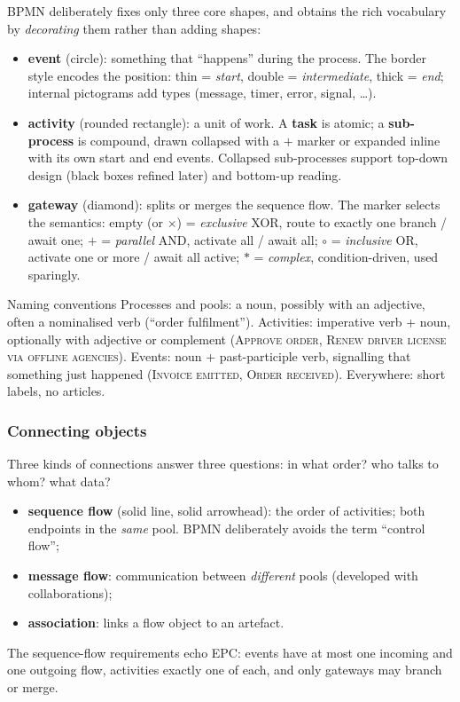 BPMN deliberately fixes only three core shapes, and obtains the rich vocabulary by \emph{decorating} them rather than adding shapes:
\begin{itemize}
  \item \textbf{event} (circle): something that ``happens'' during the process. The border style encodes the position: thin = \emph{start}, double = \emph{intermediate}, thick = \emph{end}; internal pictograms add types (message, timer, error, signal, \dots).
  \item \textbf{activity} (rounded rectangle): a unit of work. A \textbf{task} is atomic; a \textbf{sub-process} is compound, drawn collapsed with a $+$ marker or expanded inline with its own start and end events. Collapsed sub-processes support top-down design (black boxes refined later) and bottom-up reading.
  \item \textbf{gateway} (diamond): splits or merges the sequence flow. The marker selects the semantics: empty (or $\times$) = \emph{exclusive} XOR, route to exactly one branch / await one; $+$ = \emph{parallel} AND, activate all / await all; $\circ$ = \emph{inclusive} OR, activate one or more / await all active; $\ast$ = \emph{complex}, condition-driven, used sparingly.
\end{itemize}

\begin{notebox}{Naming conventions}
Processes and pools: a noun, possibly with an adjective, often a nominalised verb (``order fulfilment''). Activities: imperative verb + noun, optionally with adjective or complement (\textsc{Approve order}, \textsc{Renew driver license via offline agencies}). Events: noun + past-participle verb, signalling that something just happened (\textsc{Invoice emitted}, \textsc{Order received}). Everywhere: short labels, no articles.
\end{notebox}

\subsubsection{Connecting objects}

Three kinds of connections answer three questions: in what order? who talks to whom? what data?
\begin{itemize}
  \item \textbf{sequence flow} (solid line, solid arrowhead): the order of activities; both endpoints in the \emph{same} pool. BPMN deliberately avoids the term ``control flow'';
  \item \textbf{message flow}: communication between \emph{different} pools (developed with collaborations);
  \item \textbf{association}: links a flow object to an artefact.
\end{itemize}
The sequence-flow requirements echo EPC: events have at most one incoming and one outgoing flow, activities exactly one of each, and only gateways may branch or merge.

